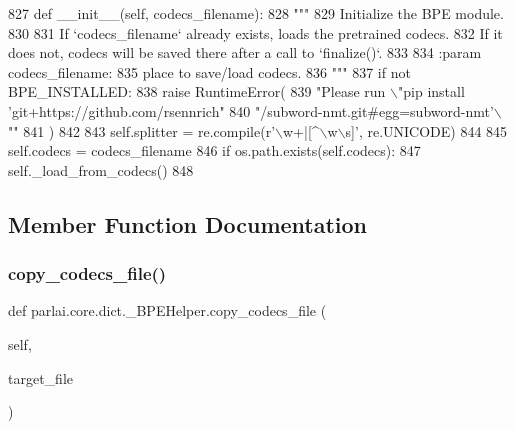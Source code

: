 \begin{DoxyCode}
827     \textcolor{keyword}{def }\_\_init\_\_(self, codecs\_filename):
828         \textcolor{stringliteral}{"""}
829 \textcolor{stringliteral}{        Initialize the BPE module.}
830 \textcolor{stringliteral}{}
831 \textcolor{stringliteral}{        If `codecs\_filename` already exists, loads the pretrained codecs.}
832 \textcolor{stringliteral}{        If it does not, codecs will be saved there after a call to `finalize()`.}
833 \textcolor{stringliteral}{}
834 \textcolor{stringliteral}{        :param codecs\_filename:}
835 \textcolor{stringliteral}{            place to save/load codecs.}
836 \textcolor{stringliteral}{        """}
837         \textcolor{keywordflow}{if} \textcolor{keywordflow}{not} BPE\_INSTALLED:
838             \textcolor{keywordflow}{raise} RuntimeError(
839                 \textcolor{stringliteral}{"Please run \(\backslash\)"pip install 'git+https://github.com/rsennrich"}
840                 \textcolor{stringliteral}{"/subword-nmt.git#egg=subword-nmt'\(\backslash\)""}
841             )
842 
843         self.splitter = re.compile(\textcolor{stringliteral}{r'\(\backslash\)w+|[^\(\backslash\)w\(\backslash\)s]'}, re.UNICODE)
844 
845         self.codecs = codecs\_filename
846         \textcolor{keywordflow}{if} os.path.exists(self.codecs):
847             self.\_load\_from\_codecs()
848 
\end{DoxyCode}


\subsection{Member Function Documentation}
\mbox{\label{classparlai_1_1core_1_1dict_1_1__BPEHelper_a712c4482ea0dc907543effce64bd8145}} 
\subsubsection{\texorpdfstring{copy\+\_\+codecs\+\_\+file()}{copy\_codecs\_file()}}
{\footnotesize\ttfamily def parlai.\+core.\+dict.\+\_\+\+B\+P\+E\+Helper.\+copy\+\_\+codecs\+\_\+file (\begin{DoxyParamCaption}\item[{}]{self,  }\item[{}]{target\+\_\+file }\end{DoxyParamCaption})}

